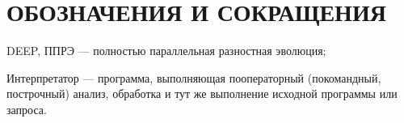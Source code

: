 \chapter*{ОБОЗНАЧЕНИЯ И СОКРАЩЕНИЯ}

\noindent DEEP, ППРЭ --- полностью параллельная разностная эволюция;

\noindent Интерпретатор --- программа, выполняющая пооператорный (покомандный, построчный) анализ, обработка и тут же выполнение исходной программы или запроса.

